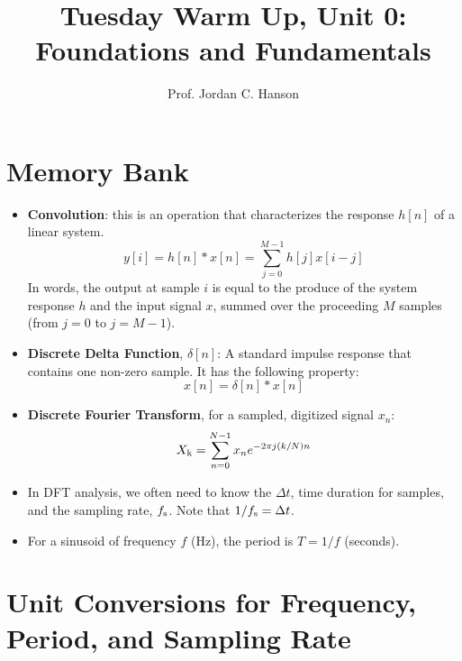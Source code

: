 \documentclass{article}
\begin{document}
\twocolumn

\title{Tuesday Warm Up, Unit 0: Foundations and Fundamentals}
\author{Prof. Jordan C. Hanson}
\maketitle

\section{Memory Bank}
\small
\begin{itemize}
\item \textbf{Convolution}: this is an operation that characterizes the response $h[n]$ of a linear system.
\begin{equation}
y[i] = h[n] * x[n] = \sum_{j=0}^{M-1}h[j]x[i-j] \label{eq:conv}
\end{equation}
In words, the output at sample $i$ is equal to the produce of the system response $h$ and the input signal $x$, summed over the proceeding $M$ samples (from $j=0$ to $j=M-1$).
\item \textbf{Discrete Delta Function}, $\delta[n]$: A standard impulse response that contains one non-zero sample.  It has the following property:
\begin{equation}
x[n] = \delta[n] * x[n] \label{eq:conv2}
\end{equation}
\item \textbf{Discrete Fourier Transform}, for a sampled, digitized signal $x_n$:
\begin{equation}
X_{\rm k} = \sum_{n=0}^{N-1} x_n e^{-2\pi j (k/N) n}
\end{equation}
\item In DFT analysis, we often need to know the $\Delta t$, time duration for samples, and the sampling rate, $f_{\rm s}$.  Note that $1/f_{\rm s} = \Delta t$.
\item For a sinusoid of frequency $f$ (Hz), the period is $T = 1/f$ (seconds).
\end{itemize}

\section{Unit Conversions for Frequency, Period, and Sampling Rate}
\end{document}
